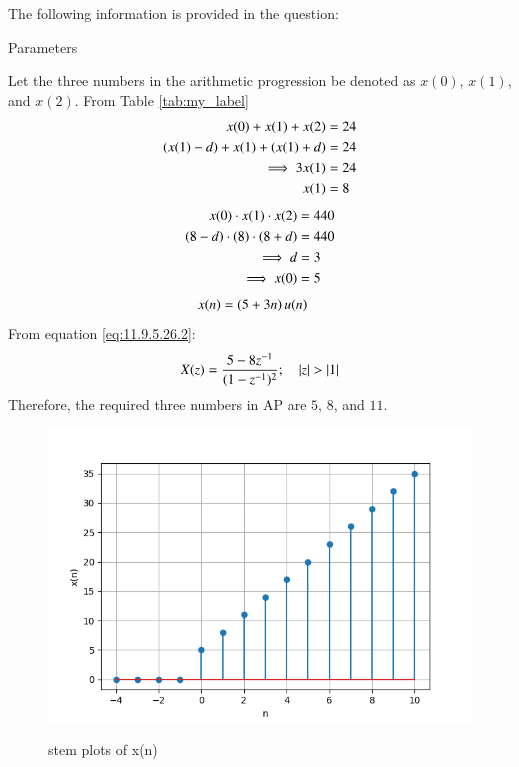 \documentclass[journal,12pt,twocolumn]{IEEEtran}
\theoremstyle{remark}
\begin{document}
\solution
The following information is provided in the question:
\begin{table}[h]
 	\centering
 	\resizebox{6 cm}{!}{
 		
 	}
 	\vspace{6 pt}
 	\caption{Parameters}
 	\label{tab:my_label} 
 \end{table}
\newline
Let the three numbers in the arithmetic progression be denoted as $x(0)$, $x(1)$, and $x(2)$.
\newline
From Table \ref{tab:my_label}
\begin{align}
  x(0) + x(1) + x(2) &= 24 \\
   \left(x(1) - d\right) + x(1) + \left(x(1) + d\right) &= 24 \\
    \implies 3x(1) &= 24 \\ 
    x(1) &= 8 
\end{align}
\begin{align}
   x(0) \cdot x(1) \cdot x(2) &= 440  \\
 \left(8-d\right) \cdot \left(8\right) \cdot \left(8+d\right) &= 440  \\
  \implies d &= 3 \\
  \implies x(0) &= 5
\end{align}
\begin{align}
     x(n) &= \left(5 + 3n\right)u(n)  
 \end{align}
 From equation \eqref{eq:11.9.5.26.2}:  
\begin{align}      
  X(z) = \frac{5 - 8z^{-1}}{(1-z^{-1})^2} ; \quad \left\vert z\right\vert > \left\vert1\right\vert  
\end{align}
Therefore, the required three numbers in AP are $5$, $8$, and $11$.
\begin{figure}[h!]
  \centering
  \includegraphics[width=\columnwidth]{figs/stem_plot.png} 
  \label{fig:1}
  \caption{stem plots of x(n)}
\end{figure}
\end{document}
